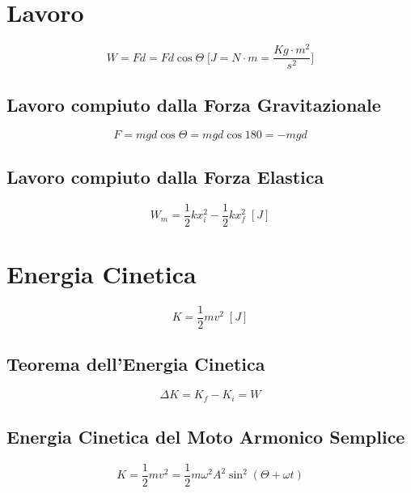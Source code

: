    \section*{Lavoro}

        \begin{equation*}
            W = Fd = Fd \cos \Theta \;\Bigg[J = N \cdot m = 
            \frac{Kg \cdot m^2}{s^2}\Bigg]
        \end{equation*}

        \subsection*{Lavoro compiuto dalla Forza Gravitazionale}
            \begin{equation*}
                F = mgd\cos \Theta = mgd \cos 180 = - mgd
            \end{equation*}

        \subsection*{Lavoro compiuto dalla Forza Elastica} 
            \begin{equation*}
                W_m = \frac{1}{2}kx^2_i - \frac{1}{2}kx^2_f \;[J]
            \end{equation*}

    \section*{Energia Cinetica}
        \begin{equation*}
            K = \frac{1}{2}mv^2 \;[J]
        \end{equation*}

        \subsection*{Teorema dell'Energia Cinetica}
            \begin{equation*}
                \Delta K = K_f - K_i = W
            \end{equation*}

        \subsection*{Energia Cinetica del Moto Armonico Semplice}
            \begin{equation*}
                K = \frac{1}{2}mv^2 = \frac{1}{2}m\omega^2A^2\sin^2
                (\Theta + \omega t)
            \end{equation*}


